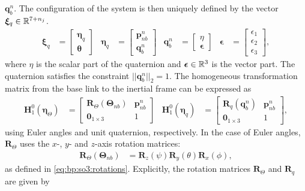 $\bm{q}_b^n$.
The configuration of the system is then uniquely defined by the vector $\bm{\xi}_q \in \mathbb{R}^{7+n_j}$.
\begin{align}
    \bm{\xi}_q &= \begin{bmatrix}\bm{\eta}_q \\ \bm{\theta} \end{bmatrix} &
        \bm{\eta}_q &= \begin{bmatrix}\bm{p}_{nb}^n \\ \bm{q}_b^n \end{bmatrix} &
            \bm{q}_{b}^n &= \begin{bmatrix}\eta \\ \bm{\epsilon} \end{bmatrix} &
                \bm{\epsilon} &= \begin{bmatrix}\epsilon_1 \\ \epsilon_2 \\ \epsilon_3 \end{bmatrix},
\end{align}
where $\eta$ is the scalar part of the quaternion and $\bm{\epsilon} \in \mathbb{R}^3$ is the vector part.
The quaternion satisfies the constraint $||\bm{q}_b^n||_2 = 1$. The homogeneous
transformation matrix from the base link to the inertial frame can be expressed as
\begin{align}
    \bm{H}_1^0(\bm{\eta}_{\Theta}) &= \begin{bmatrix}
        \bm{R}_{\Theta}(\bm{\Theta}_{nb})& \bm{p}_{nb}^n \\
        \bm{0}_{1\times3} & 1
    \end{bmatrix} &
    \bm{H}_1^0(\bm{\eta}_{q}) &= \begin{bmatrix}
        \bm{R}_{q}(\bm{q}_{b}^n)& \bm{p}_{nb}^n \\
        \bm{0}_{1\times3} & 1
    \end{bmatrix},
    \label{eq:H1}
\end{align}
using Euler angles and unit quaternion, respectively. In the case of Euler angles,
$\bm{R}_{\Theta}$ uses the $x$-, $y$- and $z$-axis rotation matrices:
\begin{align}
    \bm{R}_{\Theta}(\bm{\Theta}_{nb}) &= \bm{R}_z(\psi) \bm{R}_y(\theta) \bm{R}_x(\phi),
\end{align}
as defined in \autoref{eq:bp:so3:rotations}. Explicitly, the rotation matrices $\bm{R}_{\Theta}$ and \(\bm{R}_{q}\)
are given by
